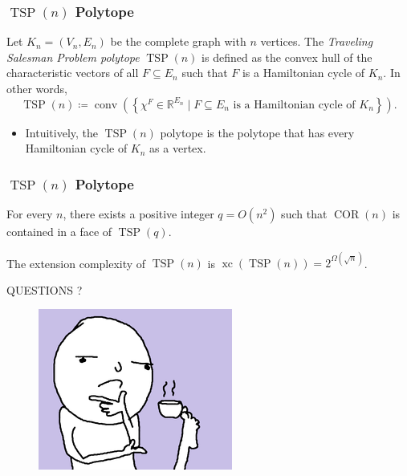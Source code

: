 \documentclass{beamer}
\newcommand{\conv}{\operatorname{conv}}
\newcommand{\xc}{\operatorname{xc}}
\newcommand{\TSP}{\operatorname{TSP}}
\newcommand{\COR}{\operatorname{COR}}
\renewcommand{\R}{\mathbb{R}}
\begin{document}
\begin{frame}
\frametitle{$\TSP(n)$ Polytope}

\pause
\begin{definition}[$\TSP$ Polytope]
Let $K_n = (V_n, E_n)$ be the complete graph with $n$ vertices. The \emph{Traveling Salesman Problem polytope} $\TSP(n)$ is defined as the convex hull of the characteristic vectors of all $F \subseteq E_n$ such that $F$ is a Hamiltonian cycle of $K_n$. In other words,
\[
\TSP(n) \coloneqq \conv\left(\left\{\chi^F \in \R^{E_n} \mid F \subseteq E_n \text{ is a Hamiltonian cycle of $K_n$}\right\}\right).
\]
\end{definition}

\pause
\begin{itemize}
\item Intuitively, the $\TSP(n)$ polytope is the polytope that has every Hamiltonian cycle of $K_n$ as a vertex.
\end{itemize}

\end{frame}

\begin{frame}
\frametitle{$\TSP(n)$ Polytope}

\pause
\begin{lemma}
For every $n$, there exists a positive integer $q = O(n^2)$ such that $\COR(n)$ is contained in a face of $\TSP(q)$.
\end{lemma}

\pause
\begin{theorem}
The extension complexity of $\TSP(n)$ is $\xc\left(\TSP(n)\right) = 2^{\Omega\left(\sqrt{n}\right)}$.
\end{theorem}

\end{frame}

\begin{frame}
\begin{center}
\LARGE{QUESTIONS ?}
\end{center}
\begin{figure}
        \centering
        \begin{minipage}{.5\textwidth}
            \centering
            \includegraphics[width=.8\linewidth]{questions.png}
        \end{minipage}%
        
\end{figure}
\end{frame}
\end{document}
